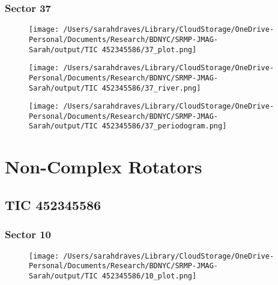 \documentclass{report}%
\begin{document}
%
\newpage%
\subsection{Sector 37}%
\label{subsec:TIC45234558637}%


\begin{figure}[H]%
\begin{center}%
\centering%
\texttt{[image: /Users/sarahdraves/Library/CloudStorage/OneDrive-Personal/Documents/Research/BDNYC/SRMP-JMAG-Sarah/output/TIC 452345586/37\_plot.png]}%
\end{center}%
\end{figure}

%


\begin{figure}[H]%
\begin{center}%
\centering%
\texttt{[image: /Users/sarahdraves/Library/CloudStorage/OneDrive-Personal/Documents/Research/BDNYC/SRMP-JMAG-Sarah/output/TIC 452345586/37\_river.png]}%
\end{center}%
\end{figure}

%


\begin{figure}[H]%
\begin{center}%
\centering%
\texttt{[image: /Users/sarahdraves/Library/CloudStorage/OneDrive-Personal/Documents/Research/BDNYC/SRMP-JMAG-Sarah/output/TIC 452345586/37\_periodogram.png]}%
\end{center}%
\end{figure}

%
\chapter{Non{-}Complex Rotators}%
\label{chap:Non{-}ComplexRotators}%
\newpage%
\section{TIC 452345586}%
\label{sec:TIC452345586}%
\subsection{Sector 10}%
\label{subsec:TIC45234558610}%


\begin{figure}[H]%
\begin{center}%
\centering%
\texttt{[image: /Users/sarahdraves/Library/CloudStorage/OneDrive-Personal/Documents/Research/BDNYC/SRMP-JMAG-Sarah/output/TIC 452345586/10\_plot.png]}%
\end{center}%
\end{figure}
\end{document}
